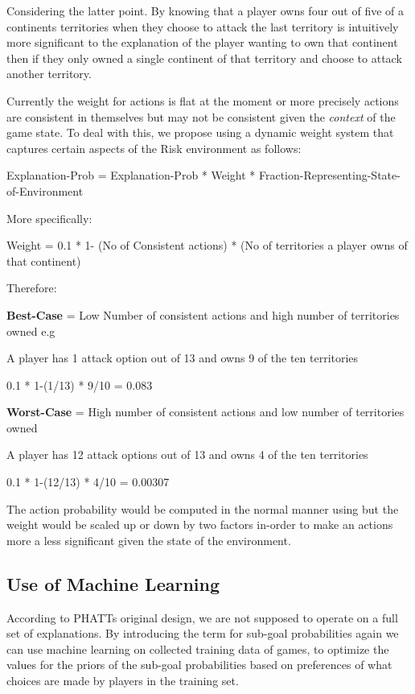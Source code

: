 \documentclass[parskip]{cs4rep}
\begin{document}
Considering the latter point. By knowing that a player owns four out of five of a continents territories when they choose to attack the last territory is intuitively more significant to the explanation of the player wanting to own that continent then if they only owned a single continent of that territory and choose to attack another territory.

Currently the weight for actions is flat at the moment or more precisely actions are consistent in themselves but may not be consistent given the \textit{context} of the game state. To deal with this, we propose using a dynamic weight system that captures certain aspects of the Risk environment as follows:

Explanation-Prob = Explanation-Prob * Weight * Fraction-Representing-State-of-Environment

More specifically:\newline

\centerline{
Weight = 0.1 * 1- (No of Consistent actions) * (No of territories a player owns of that continent)
}

Therefore:

\textbf{Best-Case} = Low Number of consistent actions and high number of territories owned e.g

A player has 1 attack option out of 13 and owns 9 of the ten territories\newline

\centerline{
0.1 * 1-(1/13) * 9/10  = 0.083
}

\textbf{Worst-Case} = High number of consistent actions and low number of territories owned

A player has 12 attack options out of 13 and owns 4 of the ten territories

\centerline{
0.1 * 1-(12/13) * 4/10 = 0.00307
}

The action probability would be computed in the normal manner using but the weight would be scaled up or down by two factors in-order to make an actions more a less significant given the state of the environment.

\subsection{Use of Machine Learning}

According to PHATTs original design, we are not supposed to operate on a full set of explanations. By introducing the term for sub-goal probabilities again we can use machine learning on collected training data of games, to optimize the values for the priors of the sub-goal probabilities based on preferences of what choices are made by players in the training set.
\end{document}
